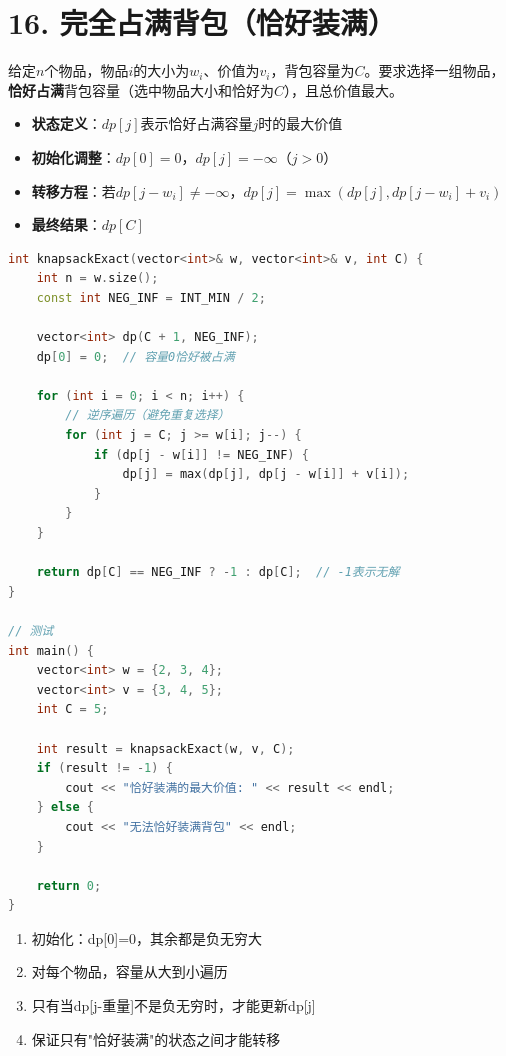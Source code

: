\section*{16. 完全占满背包（恰好装满）}

给定$n$个物品，物品$i$的大小为$w_i$、价值为$v_i$，背包容量为$C$。要求选择一组物品，\textbf{恰好占满}背包容量（选中物品大小和恰好为$C$），且总价值最大。



\begin{itemize}
    \item \textbf{状态定义}：$dp[j]$表示恰好占满容量$j$时的最大价值
    \item \textbf{初始化调整}：$dp[0] = 0$，$dp[j] = -\infty$（$j > 0$）
    \item \textbf{转移方程}：若$dp[j-w_i] \ne -\infty$，$dp[j] = \max(dp[j], dp[j-w_i] + v_i)$
    \item \textbf{最终结果}：$dp[C]$
\end{itemize}
\begin{lstlisting}[language=C++, style=cppstyle]
int knapsackExact(vector<int>& w, vector<int>& v, int C) {
    int n = w.size();
    const int NEG_INF = INT_MIN / 2;

    vector<int> dp(C + 1, NEG_INF);
    dp[0] = 0;  // 容量0恰好被占满

    for (int i = 0; i < n; i++) {
        // 逆序遍历（避免重复选择）
        for (int j = C; j >= w[i]; j--) {
            if (dp[j - w[i]] != NEG_INF) {
                dp[j] = max(dp[j], dp[j - w[i]] + v[i]);
            }
        }
    }

    return dp[C] == NEG_INF ? -1 : dp[C];  // -1表示无解
}

// 测试
int main() {
    vector<int> w = {2, 3, 4};
    vector<int> v = {3, 4, 5};
    int C = 5;

    int result = knapsackExact(w, v, C);
    if (result != -1) {
        cout << "恰好装满的最大价值: " << result << endl;
    } else {
        cout << "无法恰好装满背包" << endl;
    }

    return 0;
}
\end{lstlisting}


\begin{enumerate}
    \item 初始化：dp[0]=0，其余都是负无穷大
    \item 对每个物品，容量从大到小遍历
    \item 只有当dp[j-重量]不是负无穷时，才能更新dp[j]
    \item 保证只有"恰好装满"的状态之间才能转移
\end{enumerate}

